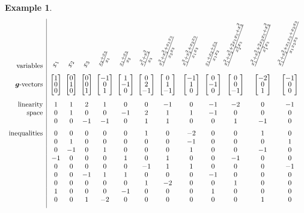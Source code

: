 \documentclass{amsart}
\theoremstyle{definition}
\newtheorem{example}[theorem]{Example}
\renewcommand{\b}[1]{{\boldsymbol{#1}}} %
\newcommand{\compactVector}[3]{\begin{bmatrix} #1 \\[-.1cm] #2 \\[-.1cm] #3 \end{bmatrix}}
\begin{document}
\begin{example}
\[
\begin{array}{r|c@{\;\;}c@{\;\;}c@{\;\;}c@{\;\;}c@{\;\;}c@{\;}c@{\;}c@{\;}c@{}c@{}c@{}c}
\text{variables} & \rotatebox{70}{$x_1$} & \rotatebox{70}{$x_2$} & \rotatebox{70}{$x_3$} & \rotatebox{70}{$\frac{x_2 + x_3}{x_1}$} & \rotatebox{70}{$\frac{x_1 + x_3}{x_2}$} & \rotatebox{70}{$\frac{x_1^2 + x_2^2}{x_3}$} & \rotatebox{70}{$\frac{x_1^2 + x_2^2 + x_1 x_3}{x_2 x_3}$} & \rotatebox{70}{$\frac{x_1^2 + x_2^2 + x_2 x_3}{x_1 x_3}$} & \rotatebox{70}{$\frac{x_1 + x_2 + x_3}{x_1 x_2}$} & \rotatebox{70}{$\frac{x_1^2 + x_2^2 + 2 x_1 x_3 + x_3^2}{x_2^2 x_3}$} & \rotatebox{70}{$\frac{x_1^2 + x_2^2 + 2 x_2 x_3 + x_3^2}{x_1^2 x_3}$} & \rotatebox{70}{$\frac{x_1^2 + x_2^2 + x_1 x_3 + x_2 x_3}{x_1 x_2 x_3}$} \\[.2cm]
\text{$\b{g}$-vectors} & \compactVector{1}{0}{0} & \compactVector{0}{1}{0} & \compactVector{0}{0}{1} & \compactVector{-1}{0}{1} & \compactVector{1}{-1}{0} & \compactVector{0}{2}{-1} & \compactVector{0}{1}{-1} & \compactVector{-1}{1}{0} & \compactVector{0}{-1}{0} & \compactVector{0}{0}{-1} & \compactVector{-2}{0}{1} & \compactVector{-1}{0}{0}  \\[.6cm]
\text{linearity}	& 1 & 1 & 2 & 1 & 0 & 0 & -1 & 0 & -1 & -2 & 0 & -1 \\
\text{space}		& 0 & 1 & 0 & 0 & -1 & 2 & 1 & 1 & -1 & 0 & 0 & 0 \\
					& 0 & 0 & -1 & -1 & 0 & 1 & 1 & 0 & 0 & 1 & -1 & 0 \\[.2cm]
\text{inequalities} & 0 & 0 & 0 & 0 & 0 & 1 & 0 & -2 & 0 & 0 & 1 & 0 \\
					& 0 & 1 & 0 & 0 & 0 & 0 & 0 & -1 & 0 & 0 & 0 & 1 \\
					& 0 & -1 & 0 & 1 & 0 & 0 & 0 & 1 & 0 & 0 & -1 & 0 \\
					& -1 & 0 & 0 & 0 & 1 & 0 & 1 & 0 & 0 & -1 & 0 & 0 \\
					& 0 & 0 & 0 & 0 & 0 & -1 & 1 & 1 & 0 & 0 & 0 & -1 \\
					& 0 & 0 & -1 & 1 & 1 & 0 & 0 & 0 & -1 & 0 & 0 & 0 \\
					& 0 & 0 & 0 & 0 & 0 & 1 & -2 & 0 & 0 & 1 & 0 & 0 \\
					& 1 & 0 & 0 & 0 & -1 & 0 & 0 & 0 & 1 & 0 & 0 & 0 \\
					& 0 & 0 & 1 & -2 & 0 & 0 & 0 & 0 & 0 & 0 & 1 & 0 \\[.2cm]
\end{array}
\]


\end{example}
\end{document}
